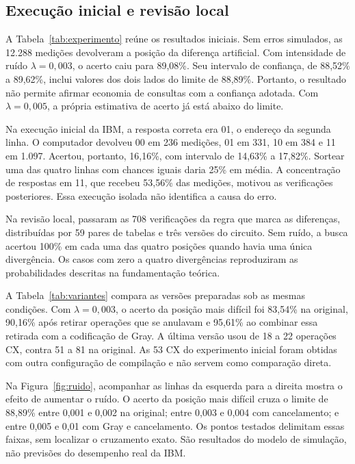 \subsection{Execução inicial e revisão local}
A Tabela~\ref{tab:experimento} reúne os resultados iniciais. Sem erros simulados, as 12.288 medições devolveram a posição da diferença artificial. Com intensidade de ruído $\lambda=0{,}003$, o acerto caiu para 89,08\%. Seu intervalo de confiança, de 88,52\% a 89,62\%, inclui valores dos dois lados do limite de 88,89\%. Portanto, o resultado não permite afirmar economia de consultas com a confiança adotada. Com $\lambda=0{,}005$, a própria estimativa de acerto já está abaixo do limite.

Na execução inicial da IBM, a resposta correta era 01, o endereço da segunda linha. O computador devolveu 00 em 236 medições, 01 em 331, 10 em 384 e 11 em 1.097. Acertou, portanto, 16,16\%, com intervalo de 14,63\% a 17,82\%. Sortear uma das quatro linhas com chances iguais daria 25\% em média. A concentração de respostas em 11, que recebeu 53,56\% das medições, motivou as verificações posteriores. Essa execução isolada não identifica a causa do erro.

Na revisão local, passaram as 708 verificações da regra que marca as diferenças, distribuídas por 59 pares de tabelas e três versões do circuito. Sem ruído, a busca acertou 100\% em cada uma das quatro posições quando havia uma única divergência. Os casos com zero a quatro divergências reproduziram as probabilidades descritas na fundamentação teórica.

A Tabela~\ref{tab:variantes} compara as versões preparadas sob as mesmas condições. Com $\lambda=0{,}003$, o acerto da posição mais difícil foi 83,54\% na original, 90,16\% após retirar operações que se anulavam e 95,61\% ao combinar essa retirada com a codificação de Gray. A última versão usou de 18 a 22 operações CX, contra 51 a 81 na original. As 53 CX do experimento inicial foram obtidas com outra configuração de compilação e não servem como comparação direta.

Na Figura~\ref{fig:ruido}, acompanhar as linhas da esquerda para a direita mostra o efeito de aumentar o ruído. O acerto da posição mais difícil cruza o limite de 88,89\% entre 0,001 e 0,002 na original; entre 0,003 e 0,004 com cancelamento; e entre 0,005 e 0,01 com Gray e cancelamento. Os pontos testados delimitam essas faixas, sem localizar o cruzamento exato. São resultados do modelo de simulação, não previsões do desempenho real da IBM.

